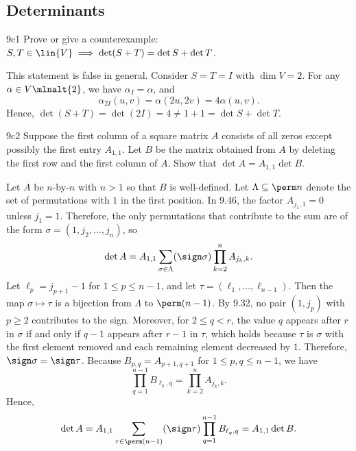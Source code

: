 \subsection{Determinants}

\begin{exercise}{9c1}
    Prove or give a counterexample: $S, T \in \lin{V} \implies \det(S + T) = \det S + \det T$.
\end{exercise}

\begin{sol}
    This statement is false in general.
    Consider $S = T = I$ with $\dim V = 2$.
    For any $\alpha \in V\mlnalt{2}$, we have $\alpha_I = \alpha$, and
    \[
        \alpha_{2I}(u, v) = \alpha(2u, 2v) = 4 \alpha(u, v).
    \]
    Hence, $\det(S + T) = \det(2I) = 4 \neq 1 + 1 = \det S + \det T$.
\end{sol}

\begin{exercise}{9c2}
    Suppose the first column of a square matrix $A$ consists of all zeros except possibly the first entry $A_{1,1}$.
    Let $B$ be the matrix obtained from $A$ by deleting the first row and the first column of $A$.
    Show that $\det A = A_{1,1} \det B$.
\end{exercise}

\begin{sol}
    Let $A$ be $n$-by-$n$ with $n > 1$ so that $B$ is well-defined.
    Let $\Lambda \subseteq \perm n$ denote the set of permutations with $1$ in the first position.
    In 9.46, the factor $A_{j_1, 1} = 0$ unless $j_1 = 1$.
    Therefore, the only permutations that contribute to the sum are of the form $\sigma = (1, j_2, \ldots, j_n)$, so
    \[
        \det A = A_{1, 1} \sum_{\sigma \in \Lambda} (\sign \sigma) \prod_{k=2}^n A_{j_k, k}.
    \]
    Let $\ell_p = j_{p+1} - 1$ for $1 \leq p \leq n-1$, and let $\tau = (\ell_1, \ldots, \ell_{n-1})$.
    Then the map $\sigma \mapsto \tau$ is a bijection from $\Lambda$ to $\perm(n-1)$.
    By 9.32, no pair $(1, j_p)$ with $p \geq 2$ contributes to the sign.
    Moreover, for $2 \leq q < r$, the value $q$ appears after $r$ in $\sigma$ if and only if $q-1$ appears after $r-1$ in $\tau$, which holds because $\tau$ is $\sigma$ with the first element removed and each remaining element decreased by $1$.
    Therefore, $\sign \sigma = \sign \tau$.
    Because $B_{p,q} = A_{p+1, q+1}$ for $1 \leq p, q \leq n-1$, we have
    \[
        \prod_{q=1}^{n-1} B_{\ell_q, q} = \prod_{k=2}^n A_{j_k, k}.
    \]
    Hence,
    \[
        \det A = A_{1,1} \sum_{\tau \in \perm(n-1)} (\sign \tau) \prod_{q=1}^{n-1} B_{\ell_q, q} = A_{1,1} \det B.
    \]
\end{sol}

